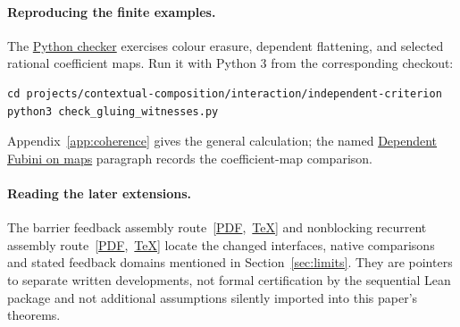 \documentclass[11pt]{article}
\numberwithin{equation}{section}
\theoremstyle{definition}\newtheorem{definition}[theorem]{Definition}
\begin{document}
\paragraph{Reproducing the finite examples.}
The \href{https://github.com/eternal-november/eos-research-programmes/blob/cdf5077225ded75a4f8042909a48ffd04d7cb51d/projects/contextual-composition/interaction/independent-criterion/check_gluing_witnesses.py}{Python checker} exercises colour erasure, dependent flattening, and selected
rational coefficient maps. Run it with Python 3 from the corresponding
checkout:
\begin{verbatim}
cd projects/contextual-composition/interaction/independent-criterion
python3 check_gluing_witnesses.py
\end{verbatim}
Appendix~\ref{app:coherence}
gives the general calculation; the named
\hyperref[par:dependent-fubini-maps]{Dependent Fubini on maps} paragraph
records the coefficient-map comparison.

\paragraph{Reading the later extensions.}
The
barrier feedback assembly route~\mbox{[\href{https://github.com/eternal-november/eos-research-programmes/blob/10e771644cfdf58c3d05e989e4b26cae7164c80a/projects/contextual-composition/foundations/native-whole-scope-feedback/Barrier_Feedback_Assembly_Reading_Route.pdf}{PDF}, \href{https://github.com/eternal-november/eos-research-programmes/blob/10e771644cfdf58c3d05e989e4b26cae7164c80a/projects/contextual-composition/foundations/native-whole-scope-feedback/Barrier_Feedback_Assembly_Reading_Route.tex}{TeX}]}
and
nonblocking recurrent assembly route~\mbox{[\href{https://github.com/eternal-november/eos-research-programmes/blob/10e771644cfdf58c3d05e989e4b26cae7164c80a/projects/contextual-composition/foundations/native-whole-scope-feedback/Nonblocking_Recurrent_Assembly_Reading_Route.pdf}{PDF}, \href{https://github.com/eternal-november/eos-research-programmes/blob/10e771644cfdf58c3d05e989e4b26cae7164c80a/projects/contextual-composition/foundations/native-whole-scope-feedback/Nonblocking_Recurrent_Assembly_Reading_Route.tex}{TeX}]}
locate the changed interfaces, native comparisons and stated feedback domains
mentioned in Section~\ref{sec:limits}. They are pointers to separate written
developments, not formal certification by the sequential Lean package and
not additional assumptions silently imported into this paper's theorems.
\end{document}
